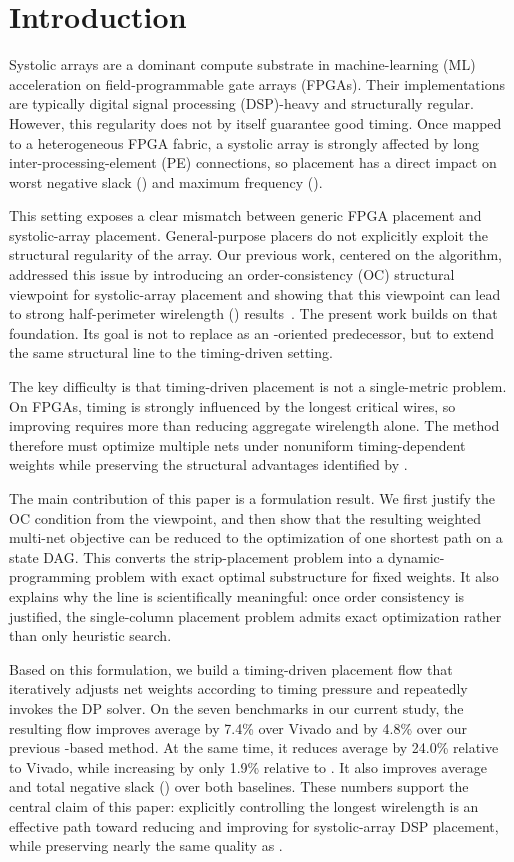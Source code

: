 \section{Introduction}

Systolic arrays are a dominant compute substrate in machine-learning (ML) acceleration on field-programmable gate arrays (FPGAs). Their implementations are typically digital signal processing (DSP)-heavy and structurally regular. However, this regularity does not by itself guarantee good timing. Once mapped to a heterogeneous FPGA fabric, a systolic array is strongly affected by long inter-processing-element (PE) connections, so placement has a direct impact on worst negative slack (\wns) and maximum frequency (\fmax).

This setting exposes a clear mismatch between generic FPGA placement and systolic-array placement. General-purpose placers do not explicitly exploit the structural regularity of the array. Our previous work, centered on the \rsad algorithm, addressed this issue by introducing an order-consistency (OC) structural viewpoint for systolic-array placement and showing that this viewpoint can lead to strong half-perimeter wirelength (\hpwl) results~\cite{rsad2023}. The present work builds on that foundation. Its goal is not to replace \rsad as an \hpwl-oriented predecessor, but to extend the same structural line to the timing-driven setting.

The key difficulty is that timing-driven placement is not a single-metric \hpwl problem. On FPGAs, timing is strongly influenced by the longest critical wires, so improving \fmax requires more than reducing aggregate wirelength alone. The method therefore must optimize multiple nets under nonuniform timing-dependent weights while preserving the structural advantages identified by \rsad.

The main contribution of this paper is a formulation result. We first justify the OC condition from the \hpwl viewpoint, and then show that the resulting weighted multi-net objective can be reduced to the optimization of one shortest path on a state DAG. This converts the strip-placement problem into a dynamic-programming problem with exact optimal substructure for fixed weights. It also explains why the \rsad line is scientifically meaningful: once order consistency is justified, the single-column placement problem admits exact optimization rather than only heuristic search.

Based on this formulation, we build a timing-driven placement flow that iteratively adjusts net weights according to timing pressure and repeatedly invokes the DP solver. On the seven benchmarks in our current study, the resulting flow improves average \fmax by 7.4\% over Vivado and by 4.8\% over our previous \rsad-based method. At the same time, it reduces average \hpwl by 24.0\% relative to Vivado, while increasing \hpwl by only 1.9\% relative to \rsad. It also improves average \wns and total negative slack (\tns) over both baselines. These numbers support the central claim of this paper: explicitly controlling the longest wirelength is an effective path toward reducing \wns and improving \fmax for systolic-array DSP placement, while preserving nearly the same \hpwl quality as \rsad.

